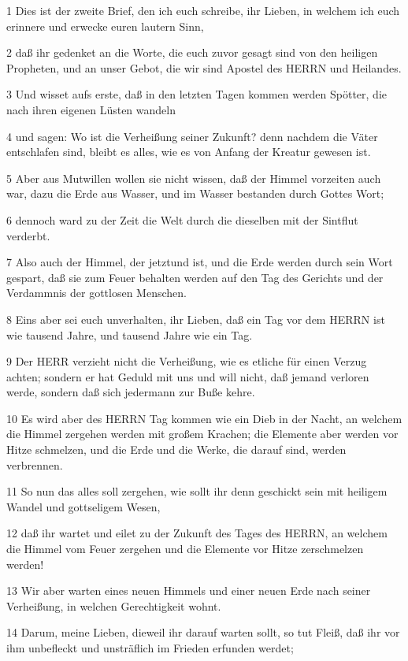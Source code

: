 \par 1 Dies ist der zweite Brief, den ich euch schreibe, ihr Lieben, in welchem ich euch erinnere und erwecke euren lautern Sinn,
\par 2 daß ihr gedenket an die Worte, die euch zuvor gesagt sind von den heiligen Propheten, und an unser Gebot, die wir sind Apostel des HERRN und Heilandes.
\par 3 Und wisset aufs erste, daß in den letzten Tagen kommen werden Spötter, die nach ihren eigenen Lüsten wandeln
\par 4 und sagen: Wo ist die Verheißung seiner Zukunft? denn nachdem die Väter entschlafen sind, bleibt es alles, wie es von Anfang der Kreatur gewesen ist.
\par 5 Aber aus Mutwillen wollen sie nicht wissen, daß der Himmel vorzeiten auch war, dazu die Erde aus Wasser, und im Wasser bestanden durch Gottes Wort;
\par 6 dennoch ward zu der Zeit die Welt durch die dieselben mit der Sintflut verderbt.
\par 7 Also auch der Himmel, der jetztund ist, und die Erde werden durch sein Wort gespart, daß sie zum Feuer behalten werden auf den Tag des Gerichts und der Verdammnis der gottlosen Menschen.
\par 8 Eins aber sei euch unverhalten, ihr Lieben, daß ein Tag vor dem HERRN ist wie tausend Jahre, und tausend Jahre wie ein Tag.
\par 9 Der HERR verzieht nicht die Verheißung, wie es etliche für einen Verzug achten; sondern er hat Geduld mit uns und will nicht, daß jemand verloren werde, sondern daß sich jedermann zur Buße kehre.
\par 10 Es wird aber des HERRN Tag kommen wie ein Dieb in der Nacht, an welchem die Himmel zergehen werden mit großem Krachen; die Elemente aber werden vor Hitze schmelzen, und die Erde und die Werke, die darauf sind, werden verbrennen.
\par 11 So nun das alles soll zergehen, wie sollt ihr denn geschickt sein mit heiligem Wandel und gottseligem Wesen,
\par 12 daß ihr wartet und eilet zu der Zukunft des Tages des HERRN, an welchem die Himmel vom Feuer zergehen und die Elemente vor Hitze zerschmelzen werden!
\par 13 Wir aber warten eines neuen Himmels und einer neuen Erde nach seiner Verheißung, in welchen Gerechtigkeit wohnt.
\par 14 Darum, meine Lieben, dieweil ihr darauf warten sollt, so tut Fleiß, daß ihr vor ihm unbefleckt und unsträflich im Frieden erfunden werdet;
